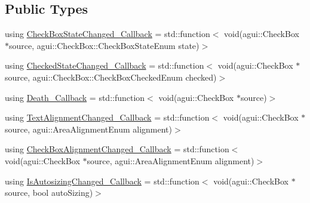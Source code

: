 \subsection*{Public Types}
\begin{DoxyCompactItemize}
\item 
using \mbox{\hyperlink{classec_1_1_generic_check_box_listener_a2737c54ec6c92a1bebda7961c6bb1852}{Check\+Box\+State\+Changed\+\_\+\+Callback}} = std\+::function$<$ void(agui\+::\+Check\+Box $\ast$source, agui\+::\+Check\+Box\+::\+Check\+Box\+State\+Enum state)$>$
\item 
using \mbox{\hyperlink{classec_1_1_generic_check_box_listener_ad1cc68469820c8bb79f278f70a8dfbe4}{Checked\+State\+Changed\+\_\+\+Callback}} = std\+::function$<$ void(agui\+::\+Check\+Box $\ast$source, agui\+::\+Check\+Box\+::\+Check\+Box\+Checked\+Enum checked)$>$
\item 
using \mbox{\hyperlink{classec_1_1_generic_check_box_listener_acd091665058b20651d26d5f43f9e3d3e}{Death\+\_\+\+Callback}} = std\+::function$<$ void(agui\+::\+Check\+Box $\ast$source)$>$
\item 
using \mbox{\hyperlink{classec_1_1_generic_check_box_listener_ab297fca8dea2b6edefe0c8d97c24c090}{Text\+Alignment\+Changed\+\_\+\+Callback}} = std\+::function$<$ void(agui\+::\+Check\+Box $\ast$source, agui\+::\+Area\+Alignment\+Enum alignment)$>$
\item 
using \mbox{\hyperlink{classec_1_1_generic_check_box_listener_a9b20541580dce7b3a1818b62524d2c6a}{Check\+Box\+Alignment\+Changed\+\_\+\+Callback}} = std\+::function$<$ void(agui\+::\+Check\+Box $\ast$source, agui\+::\+Area\+Alignment\+Enum alignment)$>$
\item 
using \mbox{\hyperlink{classec_1_1_generic_check_box_listener_ae1dcd4b36cbb45a5722b5146a62b0647}{Is\+Autosizing\+Changed\+\_\+\+Callback}} = std\+::function$<$ void(agui\+::\+Check\+Box $\ast$source, bool auto\+Sizing)$>$
\end{DoxyCompactItemize}
